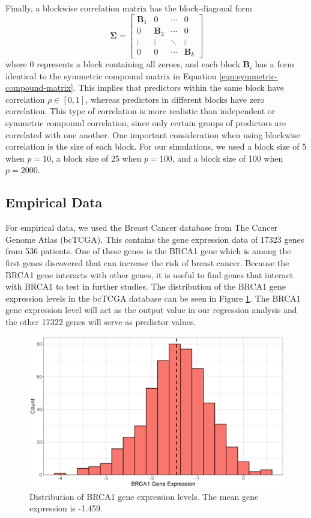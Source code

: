 \documentclass{article}
\begin{document}
Finally, a blockwise correlation matrix has the block-diagonal form
\begin{equation}
	\mathbf{\Sigma} = \begin{bmatrix}
		\mathbf{B}_1 & 0 & \cdots & 0 \\
		0 & \mathbf{B}_2 & \cdots & 0 \\
		\vdots & \vdots & \ddots & \vdots \\
		0 & 0 & \cdots & \mathbf{B}_k
	\end{bmatrix}
\end{equation}
where $0$ represents a block containing all zeroes, and each block $\mathbf{B}_i$ has a form identical to the symmetric compound matrix in Equation \ref{eqn:symmetric-compound-matrix}. This implies that predictors within the same block have correlation $\rho\in [0, 1]$, whereas predictors in different blocks have zero correlation. This type of correlation is more realistic than independent or symmetric compound correlation, since only certain groups of predictors are correlated with one another. One important consideration when using blockwise correlation is the size of each block. For our simulations, we used a block size of 5 when $p = 10$, a block size of 25 when $p = 100$, and a block size of 100 when $p = 2000$.

\subsection{Empirical Data}

For empirical data, we used the Breast Cancer database from The Cancer Genome Atlas (bcTCGA). This contains the gene expression data of 17323 genes from 536 patients. One of these genes is the BRCA1 gene which is among the first genes discovered that can increase the risk of breast cancer. Because the BRCA1 gene interacts with other genes, it is useful to find genes that interact with BRCA1 to test in further studies. The distribution of the BRCA1 gene expression levels in the bcTCGA database can be seen in Figure \ref{fig:BRCA1-distribution}. The BRCA1 gene expression level will act as the output value in our regression analysis and the other 17322 genes will serve as predictor values.

\begin{figure}[h!]
	\centering
	\includegraphics[width = 0.7\linewidth]{images/empirical_histogram.eps}
	\caption{Distribution of BRCA1 gene expression levels. The mean gene expression is -1.459.}
	\label{fig:BRCA1-distribution}
\end{figure}
\end{document}
